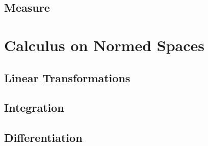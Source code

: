 \documentclass[oneside]{book}
\theoremstyle{definition}
\begin{document}
\section{Measure}




































































\chapter{Calculus on Normed Spaces}

\section{Linear Transformations}

\section{Integration}

\section{Differentiation}
\end{document}
